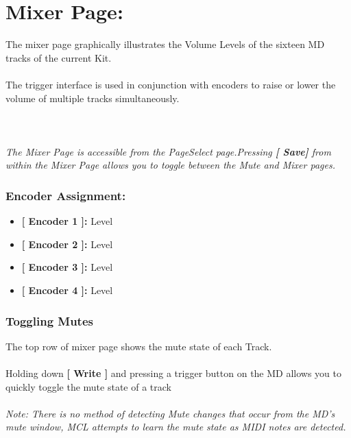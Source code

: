 \chapter{Mixer Page:}
The mixer page graphically illustrates the Volume Levels of the sixteen MD tracks of the current Kit.\\
\\
The trigger interface is used in conjunction with encoders to raise or lower the volume of multiple tracks simultaneously.\\
\\
\\\\
\textit{The Mixer Page is accessible from the PageSelect page.Pressing \textbf{[ Save] } from within the Mixer Page  allows you to toggle between the Mute and Mixer pages.}
\subsection{Encoder Assignment:}
\begin{itemize}
	\item \textbf{[ Encoder 1 ]: } Level
	\item \textbf{[ Encoder 2 ]: } Level
    \item \textbf{[ Encoder 3 ]: } Level
	\item \textbf{[ Encoder 4 ]: } Level
\end{itemize}


\subsection{Toggling Mutes}
The top row of mixer page shows the mute state of each Track. \\
\\
Holding down \textbf{[ Write ]} and pressing a trigger button on the MD allows you to quickly toggle the mute state of a track\\
\\
\textit{Note: There is no method of detecting Mute changes that occur from the MD's mute window, MCL attempts to learn the mute state as  MIDI notes are detected.}
